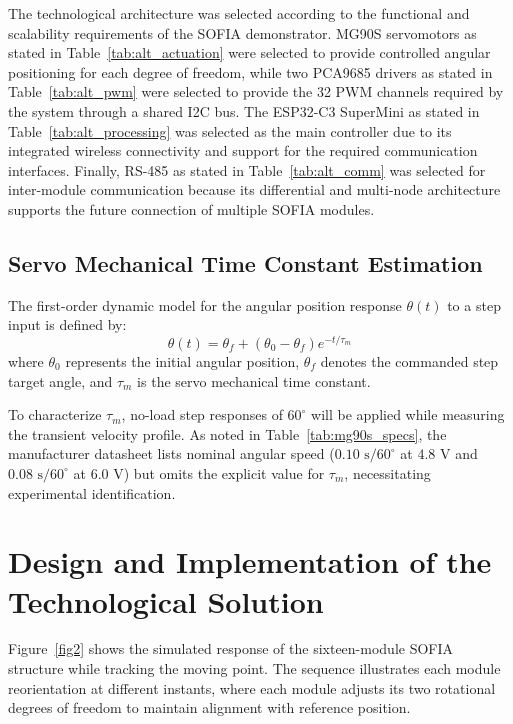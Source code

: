 \documentclass[lettersize,journal]{IEEEtran}
\begin{document}
	The technological
	architecture was selected according to the functional and scalability
	requirements of the SOFIA demonstrator. 
	MG90S servomotors as stated in Table~\ref{tab:alt_actuation} were selected to provide controlled angular positioning for each degree of freedom,
	while two PCA9685 drivers as stated in Table~\ref{tab:alt_pwm} were selected to  provide the 32 PWM channels required by the system through a shared I2C bus. The ESP32-C3 SuperMini as stated in Table~\ref{tab:alt_processing} was selected as the main controller due to its integrated wireless connectivity and support for the required communication interfaces. Finally, RS-485 as stated in Table~\ref{tab:alt_comm} was selected for inter-module communication because its differential and multi-node architecture supports the future connection of multiple
	SOFIA modules.
	
	\subsection{Servo Mechanical Time Constant Estimation}
	The first-order dynamic model for the angular position response $\theta(t)$ to a step input is defined by:
	\begin{equation}
		\theta(t) = \theta_f + (\theta_0 - \theta_f) e^{-t / \tau_m}
		\label{eq:servo_first_order}
	\end{equation}
	where $\theta_0$ represents the initial angular position, $\theta_f$ denotes the commanded step target angle, and $\tau_m$ is the servo mechanical time constant. 
	
	To characterize $\tau_m$, no-load step responses of $60^\circ$ will be applied while measuring the transient velocity profile. As noted in Table~\ref{tab:mg90s_specs}, the manufacturer datasheet \cite{mg90s} lists nominal angular speed ($0.10\text{ s}/60^\circ$ at $4.8\text{ V}$ and $0.08\text{ s}/60^\circ$ at $6.0\text{ V}$) but omits the explicit value for $\tau_m$, necessitating experimental identification.
	
	\section{Design and Implementation of the Technological Solution}
	\label{sec:design}
	
	Figure~\ref{fig2} shows the simulated response of the sixteen-module SOFIA structure while tracking the moving point. The sequence illustrates each module reorientation at different instants, where each module adjusts its two rotational degrees of freedom to maintain alignment with  reference position.
	
\end{document}
